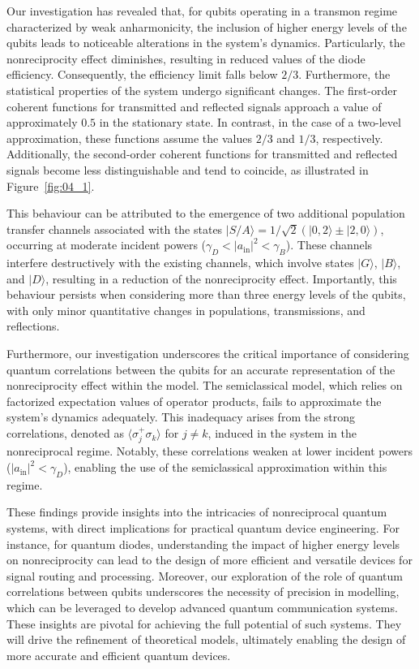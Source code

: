 \documentclass[lettersize,journal]{IEEEtran}
\begin{document}
Our investigation has revealed that, for qubits operating in a transmon regime characterized by weak anharmonicity, the inclusion of higher energy levels of the qubits leads to noticeable alterations in the system's dynamics. 
Particularly, the nonreciprocity effect diminishes, resulting in reduced values of the diode efficiency. 
Consequently, the efficiency limit falls below $2/3$. 
Furthermore, the statistical properties of the system undergo significant changes. 
The first-order coherent functions for transmitted and reflected signals approach a value of approximately $0.5$ in the stationary state. 
In contrast, in the case of a two-level approximation, these functions assume the values $2/3$ and $1/3$, respectively. 
Additionally, the second-order coherent functions for transmitted and reflected signals become less distinguishable and tend to coincide, as illustrated in Figure~\ref{fig:04_1}.

This behaviour can be attributed to the emergence of two additional population transfer channels associated with the states $|S/A\rangle = 1/\sqrt{2} \left( |0,2\rangle \pm |2,0\rangle \right)$, occurring at moderate incident powers ($\gamma_D < |a_\mathrm{in}|^2 < \gamma_B$). 
These channels interfere destructively with the existing channels, which involve states $|G\rangle$, $|B\rangle$, and $|D\rangle$, resulting in a reduction of the nonreciprocity effect. 
Importantly, this behaviour persists when considering more than three energy levels of the qubits, with only minor quantitative changes in populations, transmissions, and reflections.

Furthermore, our investigation underscores the critical importance of considering quantum correlations between the qubits for an accurate representation of the nonreciprocity effect within the model. 
The semiclassical model, which relies on factorized expectation values of operator products, fails to approximate the system's dynamics adequately. 
This inadequacy arises from the strong correlations, denoted as $\langle \sigma_j^+ \sigma_k \rangle$ for $j\neq k$, induced in the system in the nonreciprocal regime. 
Notably, these correlations weaken at lower incident powers ($|a_\mathrm{in}|^2 < \gamma_D$), enabling the use of the semiclassical approximation within this regime.

These findings provide insights into the intricacies of nonreciprocal quantum systems, with direct implications for practical quantum device engineering. 
For instance, for quantum diodes, understanding the impact of higher energy levels on nonreciprocity can lead to the design of more efficient and versatile devices for signal routing and processing. 
Moreover, our exploration of the role of quantum correlations between qubits underscores the necessity of precision in modelling, which can be leveraged to develop advanced quantum communication systems. 
These insights are pivotal for achieving the full potential of such systems. They will drive the refinement of theoretical models, ultimately enabling the design of more accurate and efficient quantum devices. 
\end{document}
